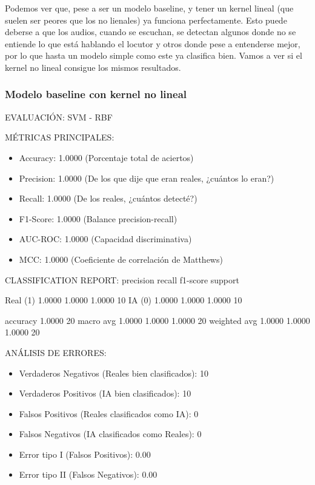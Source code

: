 Podemos ver que, pese a ser un modelo baseline, y tener un kernel lineal (que suelen ser peores que los no lienales) ya funciona perfectamente. Esto puede deberse a que los audios, cuando se escuchan, se detectan algunos donde no se entiende lo que está hablando el locutor y otros donde pese a entenderse mejor, por lo que hasta un modelo simple como este ya clasifica bien. Vamos a ver si el kernel no lineal consigue los mismos resultados.

\subsubsection*{Modelo baseline con kernel no lineal}

EVALUACIÓN: SVM - RBF

MÉTRICAS PRINCIPALES:
\begin{itemize}
	\item Accuracy:  1.0000  (Porcentaje total de aciertos)
	\item Precision: 1.0000  (De los que dije que eran reales, ¿cuántos lo eran?)
	\item Recall:    1.0000  (De los reales, ¿cuántos detecté?)
	\item F1-Score:  1.0000  (Balance precision-recall)
	\item AUC-ROC:   1.0000  (Capacidad discriminativa)
	\item MCC:       1.0000  (Coeficiente de correlación de Matthews)
\end{itemize}

CLASSIFICATION REPORT:
              precision    recall  f1-score   support

    Real (1)     1.0000    1.0000    1.0000        10
      IA (0)     1.0000    1.0000    1.0000        10

    accuracy                         1.0000        20
   macro avg     1.0000    1.0000    1.0000        20
weighted avg     1.0000    1.0000    1.0000        20


ANÁLISIS DE ERRORES:
\begin{itemize}
	\item Verdaderos Negativos (Reales bien clasificados): 10
	\item Verdaderos Positivos (IA bien clasificados): 10
	\item Falsos Positivos (Reales clasificados como IA): 0
	\item Falsos Negativos (IA clasificados como Reales): 0
	\item Error tipo I (Falsos Positivos): 0.00%
	\item Error tipo II (Falsos Negativos): 0.00%
\end{itemize}

